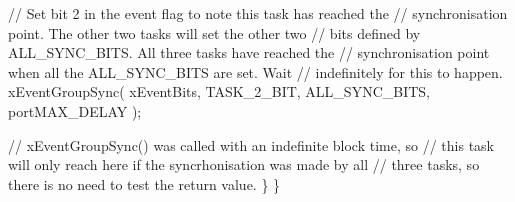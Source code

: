 \begin{DoxyPre}    // Set bit 2 in the event flag to note this task has reached the
    // synchronisation point.  The other two tasks will set the other two
    // bits defined by ALL\_SYNC\_BITS.  All three tasks have reached the
    // synchronisation point when all the ALL\_SYNC\_BITS are set.  Wait
    // indefinitely for this to happen.
    xEventGroupSync( xEventBits, TASK\_2\_BIT, ALL\_SYNC\_BITS, portMAX\_DELAY );\end{DoxyPre}



\begin{DoxyPre}    // xEventGroupSync() was called with an indefinite block time, so
    // this task will only reach here if the syncrhonisation was made by all
    // three tasks, so there is no need to test the return value.
   \}
\}\end{DoxyPre}



\begin{DoxyPre}\end{DoxyPre}
 